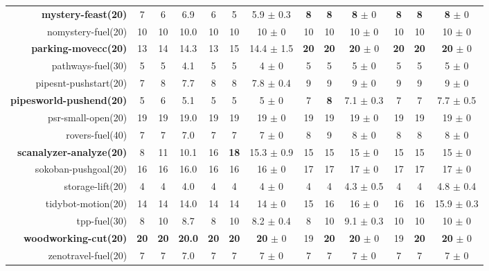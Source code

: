 \begin{center}
\begin{tabular}{|r|*{4}{ccc|}}
\textbf{mystery-feast(20)} & 7 & 6 & 6.9 & 6 & 5 & 5.9 $\pm$ 0.3 & \textbf{8} & \textbf{8} & \textbf{8} $\pm$ 0 & \textbf{8} & \textbf{8} & \textbf{8} $\pm$ 0\\
nomystery-fuel(20) & 10 & 10 & 10.0 & 10 & 10 & 10 $\pm$ 0 & 10 & 10 & 10 $\pm$ 0 & 10 & 10 & 10 $\pm$ 0\\
\textbf{parking-movecc(20)} & 13 & 14 & 14.3 & 13 & 15 & 14.4 $\pm$ 1.5 & \textbf{20} & \textbf{20} & \textbf{20} $\pm$ 0 & \textbf{20} & \textbf{20} & \textbf{20} $\pm$ 0\\
pathways-fuel(30) & 5 & 5 & 4.1 & 5 & 5 & 4 $\pm$ 0 & 5 & 5 & 5 $\pm$ 0 & 5 & 5 & 5 $\pm$ 0\\
pipesnt-pushstart(20) & 7 & 8 & 7.7 & 8 & 8 & 7.8 $\pm$ 0.4 & 9 & 9 & 9 $\pm$ 0 & 9 & 9 & 9 $\pm$ 0\\
\textbf{pipesworld-pushend(20)} & 5 & 6 & 5.1 & 5 & 5 & 5 $\pm$ 0 & 7 & \textbf{8} & 7.1 $\pm$ 0.3 & 7 & 7 & 7.7 $\pm$ 0.5\\
psr-small-open(20) & 19 & 19 & 19.0 & 19 & 19 & 19 $\pm$ 0 & 19 & 19 & 19 $\pm$ 0 & 19 & 19 & 19 $\pm$ 0\\
rovers-fuel(40) & 7 & 7 & 7.0 & 7 & 7 & 7 $\pm$ 0 & 8 & 9 & 8 $\pm$ 0 & 8 & 8 & 8 $\pm$ 0\\
\textbf{scanalyzer-analyze(20)} & 8 & 11 & 10.1 & 16 & \textbf{18} & 15.3 $\pm$ 0.9 & 15 & 15 & 15 $\pm$ 0 & 15 & 15 & 15 $\pm$ 0\\
sokoban-pushgoal(20) & 16 & 16 & 16.0 & 16 & 16 & 16 $\pm$ 0 & 17 & 17 & 17 $\pm$ 0 & 17 & 17 & 17 $\pm$ 0\\
storage-lift(20) & 4 & 4 & 4.0 & 4 & 4 & 4 $\pm$ 0 & 4 & 4 & 4.3 $\pm$ 0.5 & 4 & 4 & 4.8 $\pm$ 0.4\\
tidybot-motion(20) & 14 & 14 & 14.0 & 14 & 14 & 14 $\pm$ 0 & 15 & 16 & 16 $\pm$ 0 & 16 & 16 & 15.9 $\pm$ 0.3\\
tpp-fuel(30) & 8 & 10 & 8.7 & 8 & 10 & 8.2 $\pm$ 0.4 & 8 & 10 & 9.1 $\pm$ 0.3 & 10 & 10 & 10 $\pm$ 0\\
\textbf{woodworking-cut(20)} & \textbf{20} & \textbf{20} & \textbf{20.0} & \textbf{20} & \textbf{20} & \textbf{20} $\pm$ 0 & 19 & \textbf{20} & \textbf{20} $\pm$ 0 & 19 & \textbf{20} & \textbf{20} $\pm$ 0\\
zenotravel-fuel(20) & 7 & 7 & 7.0 & 7 & 7 & 7 $\pm$ 0 & 7 & 7 & 7 $\pm$ 0 & 7 & 7 & 7 $\pm$ 0\\
\end{tabular}
\end{center}

